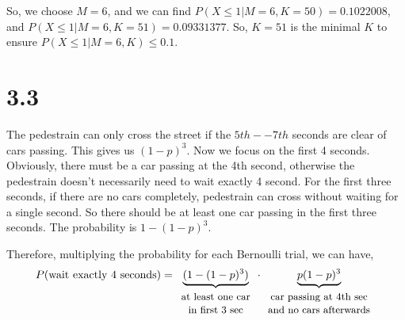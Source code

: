 \documentclass[letter]{article}
\begin{document}
\begin{enumerate}[(a)]
    So, we choose $M=6$, and we can find $P(X \le 1|M=6, K=50) = 0.1022008$, and $P(X \le 1|M=6,K=51) = 0.09331377$. So, $K=51$ is the minimal $K$ to ensure $P(X \le 1|M=6, K) \le 0.1$.
    \end{enumerate}

    \section*{3.3}
    The pedestrain can only cross the street if the $5th--7th$ seconds are clear of cars passing. This gives us $(1-p)^3$. Now we focus on the first 4 seconds. Obviously, there must be a car passing at the 4th second, otherwise the pedestrain doesn't necessarily need to wait exactly 4 second.
    For the first three seconds, if there are no cars completely, pedestrain can cross without waiting for a single second. So there should be at least one car passing in the first three seconds. The probability is $1-(1-p)^3$.

    Therefore, multiplying the probability for each Bernoulli trial, we can have,
    \[
    P(\text{wait exactly 4 seconds}) = \underbrace{(1-(1-p)^3)}_{\begin{array}{c}\text{\small at least one car} \\ \text{\small in first 3 sec}\end{array}}\cdot \underbrace{p(1-p)^3}_{\begin{array}{c}\text{\small car passing at 4th sec}\\ \text{\small and no cars afterwards}\end{array}}
    \]
\end{document}
